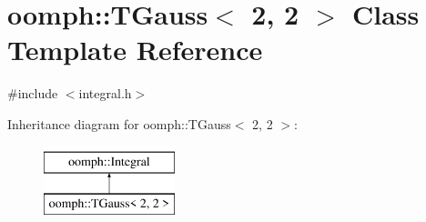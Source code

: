 \hypertarget{classoomph_1_1TGauss_3_012_00_012_01_4}{}\section{oomph\+:\+:T\+Gauss$<$ 2, 2 $>$ Class Template Reference}
\label{classoomph_1_1TGauss_3_012_00_012_01_4}


{\ttfamily \#include $<$integral.\+h$>$}

Inheritance diagram for oomph\+:\+:T\+Gauss$<$ 2, 2 $>$\+:\begin{figure}[H]
\begin{center}
\leavevmode
\includegraphics[height=2.000000cm]{classoomph_1_1TGauss_3_012_00_012_01_4}
\end{center}
\end{figure}
